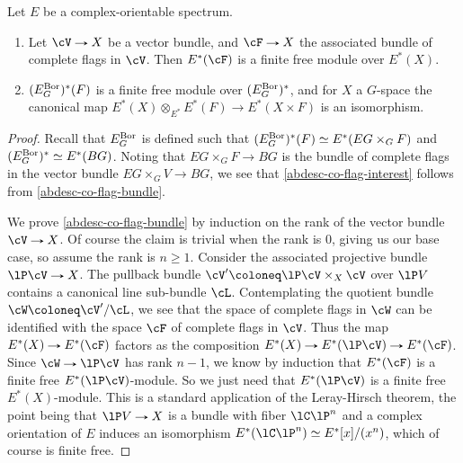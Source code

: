 \begin{lemma}
  \label{abdesc-co-flag-faithflat}
  Let $E$ be a complex-orientable spectrum.
  \begin{enumerate}
  \item \label{abdesc-co-flag-bundle} Let $\cV \to X$ be a vector
    bundle, and $\cF \to X$ the associated bundle of complete flags in
    $\cV$. Then $E^*(\cF)$ is a finite free module over $E^*(X)$.
  \item \label{abdesc-co-flag-interest} $(E^{\mathrm{Bor}}_G)^*(F)$ is a
    finite free module over $(E^{\mathrm{Bor}}_G)^*$, and for $X$ a $G$-space
    the canonical map $E^*(X) \otimes_{E^*} E^*(F) \to E^*(X \times
    F)$ is an isomorphism.
  \end{enumerate}
\end{lemma}

\begin{proof}
  Recall that $E^{\mathrm{Bor}}_G$ is defined such that
  $(E^{\mathrm{Bor}}_G)^*(F) \simeq E^*(EG \times_G F)$ and
  $(E^{\mathrm{Bor}}_G)^* \simeq E^*(BG)$. Noting that $EG \times_G F \to BG$ is
  the bundle of complete flags in the vector bundle
  $EG \times_G V \to BG$, we see that \cref{abdesc-co-flag-interest}
  follows from \cref{abdesc-co-flag-bundle}.

  We prove \cref{abdesc-co-flag-bundle} by induction on the rank of
  the vector bundle $\cV \to X$. Of course the claim is trivial when
  the rank is $0$, giving us our base case, so assume the rank is
  $n \ge 1$. Consider the associated projective bundle $\lP\cV \to X$.
  The pullback bundle $\cV' \ce \lP\cV \times_X \cV$ over $\lP V$
  contains a canonical line sub-bundle $\cL$. Contemplating the
  quotient bundle $\cW \ce \cV'/\cL$, we see that the space of
  complete flags in $\cW$ can be identified with the space $\cF$ of
  complete flags in $\cV$. Thus the map $E^*(X) \to E^*(\cF)$ factors
  as the composition $E^*(X) \to E^*(\lP\cV) \to E^*(\cF)$. Since
  $\cW \to \lP\cV$ has rank $n-1$, we know by induction that
  $E^*(\cF)$ is a finite free $E^*(\lP\cV)$-module. So we just need
  that $E^*(\lP\cV)$ is a finite free $E^*(X)$-module. This is a
  standard application of the Leray-Hirsch theorem, the point being
  that $\lP V \to X$ is a bundle with fiber $\lC\lP^n$ and a complex
  orientation of $E$ induces an isomorphism
  $E^*(\lC\lP^n) \iso E^*[x]/(x^n)$, which of course is finite free.
\end{proof}